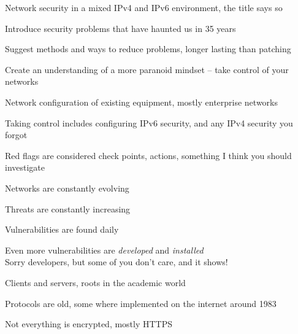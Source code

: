\documentclass[Screen16to9,17pt]{foils}
\newcommand{\myalert}{\color{red}\faFlag}
\begin{document}

\begin{list2}
\item Network security in a mixed IPv4 and IPv6 environment, the title says so \smiley
\item Introduce security problems that have haunted us in 35 years
\item Suggest methods and ways to reduce problems, longer lasting than patching
\item Create an understanding of a more paranoid mindset -- take control of your networks
\item Network configuration of existing equipment, mostly enterprise networks
\item Taking control includes configuring IPv6 security, and any IPv4 security you forgot {\myalert}
\end{list2}
{\small Red flags are considered check points, actions, something I think you should investigate}



\begin{list2}
\item Networks are constantly evolving
\item Threats are constantly increasing
\item Vulnerabilities are found daily
\item Even more vulnerabilities are \emph{developed} and \emph{installed}\\
Sorry developers, but some of you don't care, and it shows!
\end{list2}




\begin{list1}
\item Clients and servers, roots in the academic world
\item Protocols are old, some where implemented on the internet around 1983
\item Not everything is encrypted, mostly HTTPS
\end{list1}




\end{document}
